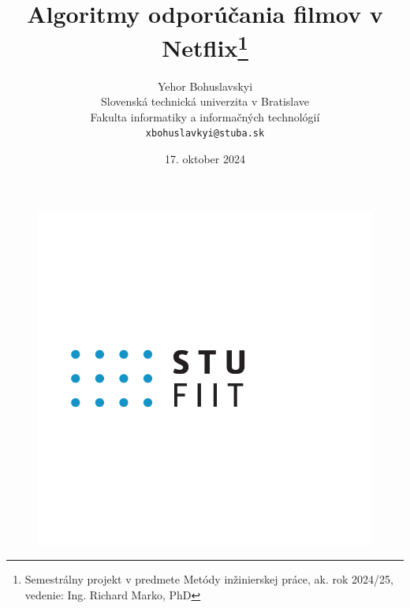\documentclass[10pt,slovak,a4paper]{article}
\title{Algoritmy odporúčania filmov v Netflix\thanks{Semestrálny projekt v predmete Metódy inžinierskej práce, ak. rok 2024/25, vedenie: Ing. Richard Marko, PhD}}
\author{Yehor Bohuslavskyi\\[2pt]
	{\small Slovenská technická univerzita v Bratislave}\\
	{\small Fakulta informatiky a informačných technológií}\\
	{\small \texttt{xbohuslavkyi@stuba.sk}}
	}
\date{\small 17. oktober 2024}
\begin{document}
\begin{figure}[h!]
  \centering
  \includegraphics[width=\textwidth]{Images/fiit_logo.png} 
\end{figure}

\maketitle
\end{document}
